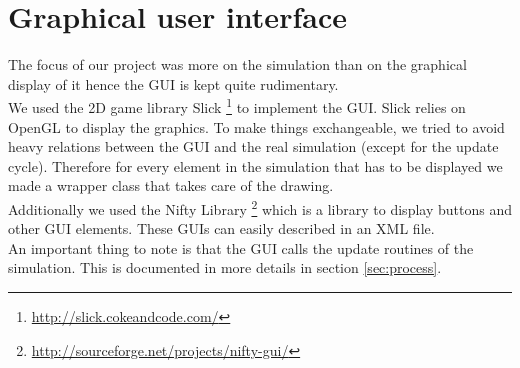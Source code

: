 
\section{Graphical user interface}
\label{sec:gui}

The focus of our project was more on the simulation than on the graphical 
display of it hence the GUI is kept quite rudimentary. \\

\noindent We used the 2D game library Slick
\footnote{\href{http://slick.cokeandcode.com/}{http://slick.cokeandcode.com/}}
to implement the GUI. Slick relies on OpenGL to display the graphics.
To make things exchangeable, we tried to avoid heavy relations between
the GUI and the real simulation (except for the update cycle).  Therefore
for every element in the simulation that has to be displayed we made a
wrapper class that takes care of the drawing. \\

\noindent Additionally we used the Nifty Library
\footnote{\href{http://sourceforge.net/projects/nifty-gui/}
{http://sourceforge.net/projects/nifty-gui/}} which is a library to
display buttons and other GUI elements. These GUIs can easily described
in an XML file. \\

\noindent An important thing to note is that the GUI calls the update routines of the
simulation. This is documented in more details in section \ref{sec:process}.

